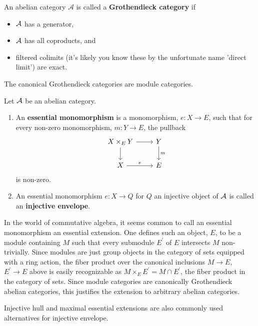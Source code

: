 \documentclass[reqno, 12pt]{amsart}
\begin{document}
\begin{definition}
  An abelian category $\mathcal{A}$ is called a \textbf{Grothendieck category} if
  \begin{itemize}
  \item
    $\mathcal{A}$ has a generator,
  \item
    $\mathcal{A}$ has all coproducts, and
  \item
    filtered colimits (it's likely you know these by the unfortunate name 'direct limit') are exact.
  \end{itemize}
\end{definition}

The canonical Grothendieck categories are module categories.

\begin{definition}
  Let $\mathcal{A}$ be an abelian category.
  \begin{enumerate}
  \item
    An \textbf{essential monomorphism} is a monomorphism, $e \colon X \to E$, such that for every non-zero monomorphism, $m \colon Y \to E$, the pullback
    $$\begin{tikzcd}
      X \times_E Y \arrow{r}\arrow{d} & Y\arrow{d}{m}\\
      X \arrow{r}{e} & E
    \end{tikzcd}$$
    is non-zero.
  \item
    An essential monomorphism $e \colon X \to Q$ for $Q$ an injective object of $\mathcal{A}$ is called an \textbf{injective envelope}.
  \end{enumerate}
\end{definition}

\begin{remark}
  In the world of commutative algebra, it seems common to call an essential monomorphism an essential extension.
  One defines such an object, $E$, to be a module containing $M$ such that every submodule $E^\prime$ of $E$ intersects $M$ non-trivially.
  Since modules are just group objects in the category of sets equipped with a ring action, the fiber product over the canonical inclusions $M \to E$, $E^\prime \to E$ above is easily recognizable as $M \times_E E^\prime = M \cap E^\prime$, the fiber product in the category of sets.
  Since module categories are canonically Grothendieck abelian categories, this justifies the extension to arbitrary abelian categories.
  
  Injective hull and maximal essential extensions are also commonly used alternatives for injective envelope.
\end{remark}
\end{document}

